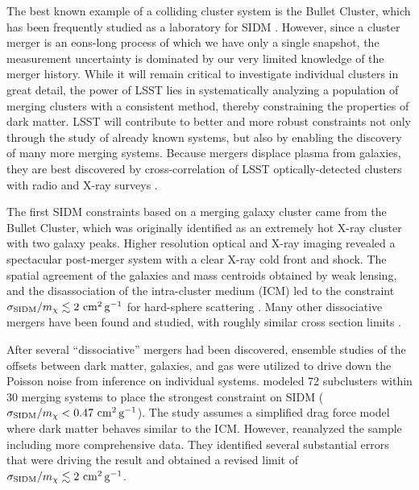 The best known example of a colliding cluster system is the Bullet Cluster, which has been frequently studied as a laboratory for SIDM \citep{Randall:2007ph,2017MNRAS.465..569R}. 
However, since a cluster merger is an eons-long process of which we have only a single snapshot, the measurement uncertainty is dominated by our very limited knowledge of the merger history. While it will remain critical to investigate individual clusters in great detail, the power of LSST lies in systematically analyzing a population of merging clusters with a consistent method, thereby constraining the properties of dark matter.
LSST will contribute to better and more robust constraints not only through the study of already known systems, but also by enabling the discovery of many more merging systems. Because mergers displace plasma from galaxies, they are best discovered by cross-correlation of LSST optically-detected clusters with radio and X-ray surveys \citep{Golovich:2018,Wilber2018}.


The first SIDM constraints based on a merging galaxy cluster came from the Bullet Cluster, which was originally identified as an extremely hot X-ray cluster with two galaxy peaks. Higher resolution optical and X-ray imaging revealed a spectacular post-merger system with a clear X-ray cold front and shock. The spatial agreement of the galaxies and mass centroids obtained by weak lensing, and the disassociation of the intra-cluster medium (ICM) led to the constraint $\sigma_{\rm SIDM}/m_\chi \lesssim 2 \mathrm{\,\mathrm{\,cm}^2\mathrm{\,g}^{-1}}$ for hard-sphere scattering \citep{Markevitch2004,Randall:2007ph,2017MNRAS.465..569R,Robertson:2016qef}. Many other dissociative mergers have been found and studied, with roughly similar cross section limits \citep[but with greater systematic uncertainty, \eg,][]{bradac2008}. 

After several ``dissociative'' mergers had been discovered, ensemble studies of the offsets between dark matter, galaxies, and gas were utilized to drive down the Poisson noise from inference on individual systems. \citet{Harvey:2015hha} modeled 72 subclusters within 30 merging systems to place the strongest constraint on SIDM ($\sigma_{\rm SIDM}/m_\chi<0.47 \mathrm{\,\mathrm{\,cm}^2\mathrm{\,g}^{-1}}$).
The study assumes a simplified drag force model where dark matter behaves similar to the ICM. However, \citet{Wittman:2017gxn} reanalyzed the sample including more comprehensive data. They identified several substantial errors that were driving the result and obtained a revised limit of $\sigma_{\rm SIDM}/m_\chi \lesssim 2\mathrm{\,\mathrm{\,cm}^2\mathrm{\,g}^{-1}}$.

